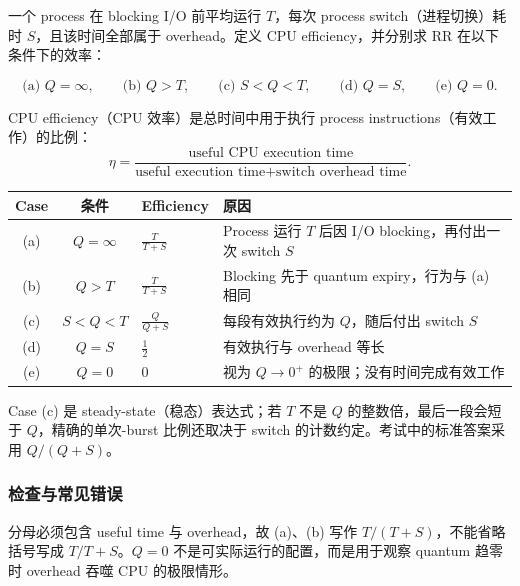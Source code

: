 一个 process 在 blocking I/O 前平均运行 $T$，每次 process switch（进程切换）耗时 $S$，且该时间全部属于 overhead。定义 CPU efficiency，并分别求 RR 在以下条件下的效率：

\[
  \text{(a) }Q=\infty,\qquad
  \text{(b) }Q>T,\qquad
  \text{(c) }S<Q<T,\qquad
  \text{(d) }Q=S,\qquad
  \text{(e) }Q=0.
\]

\begin{checkedsolution}
CPU efficiency（CPU 效率）是总时间中用于执行 process instructions（有效工作）的比例：
\[
  \eta=\frac{\text{useful CPU execution time}}
             {\text{useful execution time}+\text{switch overhead time}}.
\]

\begin{center}
\small
\begin{tabularx}{0.94\textwidth}{@{}cclX@{}}
  \toprule
  Case & 条件 & Efficiency & 原因 \\
  \midrule
  (a) & $Q=\infty$ & $\displaystyle\frac{T}{T+S}$ & Process 运行 $T$ 后因 I/O blocking，再付出一次 switch $S$ \\
  (b) & $Q>T$ & $\displaystyle\frac{T}{T+S}$ & Blocking 先于 quantum expiry，行为与 (a) 相同 \\
  (c) & $S<Q<T$ & $\displaystyle\frac{Q}{Q+S}$ & 每段有效执行约为 $Q$，随后付出 switch $S$ \\
  (d) & $Q=S$ & $\displaystyle\frac{1}{2}$ & 有效执行与 overhead 等长 \\
  (e) & $Q=0$ & $0$ & 视为 $Q\to0^+$ 的极限；没有时间完成有效工作 \\
  \bottomrule
\end{tabularx}
\end{center}

Case (c) 是 steady-state（稳态）表达式；若 $T$ 不是 $Q$ 的整数倍，最后一段会短于 $Q$，精确的单次-burst 比例还取决于 switch 的计数约定。考试中的标准答案采用 $Q/(Q+S)$。
\end{checkedsolution}

\subsubsection*{检查与常见错误}

分母必须包含 useful time 与 overhead，故 (a)、(b) 写作 $T/(T+S)$，不能省略括号写成 $T/T+S$。$Q=0$ 不是可实际运行的配置，而是用于观察 quantum 趋零时 overhead 吞噬 CPU 的极限情形。

